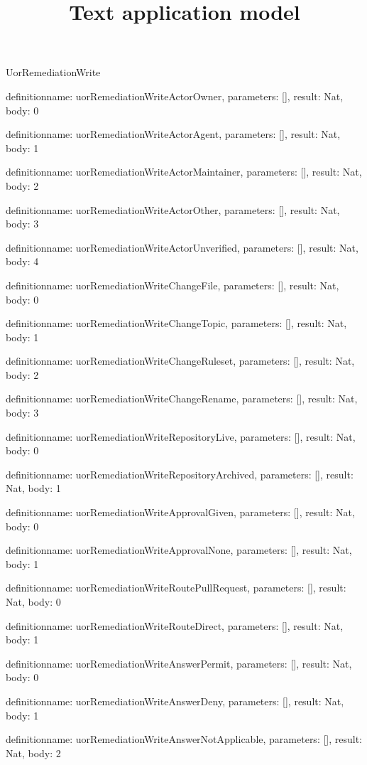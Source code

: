 \begin{lexlean}{UorRemediationWrite}
\title{Text application model}
\begin{semanticmodule}
definition{name: uorRemediationWriteActorOwner, parameters: [], result: Nat, body: 0}

definition{name: uorRemediationWriteActorAgent, parameters: [], result: Nat, body: 1}

definition{name: uorRemediationWriteActorMaintainer, parameters: [], result: Nat, body: 2}

definition{name: uorRemediationWriteActorOther, parameters: [], result: Nat, body: 3}

definition{name: uorRemediationWriteActorUnverified, parameters: [], result: Nat, body: 4}

definition{name: uorRemediationWriteChangeFile, parameters: [], result: Nat, body: 0}

definition{name: uorRemediationWriteChangeTopic, parameters: [], result: Nat, body: 1}

definition{name: uorRemediationWriteChangeRuleset, parameters: [], result: Nat, body: 2}

definition{name: uorRemediationWriteChangeRename, parameters: [], result: Nat, body: 3}

definition{name: uorRemediationWriteRepositoryLive, parameters: [], result: Nat, body: 0}

definition{name: uorRemediationWriteRepositoryArchived, parameters: [], result: Nat, body: 1}

definition{name: uorRemediationWriteApprovalGiven, parameters: [], result: Nat, body: 0}

definition{name: uorRemediationWriteApprovalNone, parameters: [], result: Nat, body: 1}

definition{name: uorRemediationWriteRoutePullRequest, parameters: [], result: Nat, body: 0}

definition{name: uorRemediationWriteRouteDirect, parameters: [], result: Nat, body: 1}

definition{name: uorRemediationWriteAnswerPermit, parameters: [], result: Nat, body: 0}

definition{name: uorRemediationWriteAnswerDeny, parameters: [], result: Nat, body: 1}

definition{name: uorRemediationWriteAnswerNotApplicable, parameters: [], result: Nat, body: 2}


\end{semanticmodule}
\end{lexlean}
